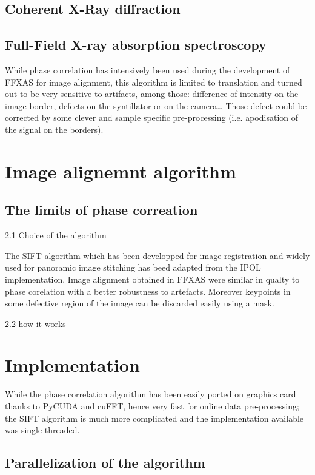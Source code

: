 \documentclass[preprint]{iucr}
\begin{document}
\subsection{Coherent X-Ray diffraction}

\subsection{Full-Field X-ray absorption spectroscopy} 


While phase correlation has intensively been used during the development of
FFXAS for image alignment, this algorithm is limited to translation and turned
out to be very sensitive to artifacts, among those: difference of intensity on
the image border, defects on the syntillator or on the camera\ldots 
Those defect could be corrected by some clever and sample specific
pre-processing (i.e. apodisation of the signal on the borders).


\section{Image alignemnt algorithm}

\subsection{The limits of phase correation} 

2.1 Choice of the algorithm

The SIFT algorithm \cite{Lowe1999,Lowe2004} which has been developped
for image registration and widely used for panoramic image stitching has beed
adapted from the IPOL\cite{ASIFT} implementation. Image alignment obtained in
FFXAS were similar in qualty to phase corelation with a better robustness to
artefacts. Moreover keypoints in some defective region of the image can be
discarded easily using a mask.


2.2 how it works


\section{Implementation}
While the phase correlation algorithm has been easily ported on graphics card
thanks to PyCUDA and cuFFT, hence very fast for online data
pre-processing; 
the SIFT algorithm is much more complicated and the implementation available was
single threaded.

\subsection{Parallelization of the algorithm}
\end{document}
